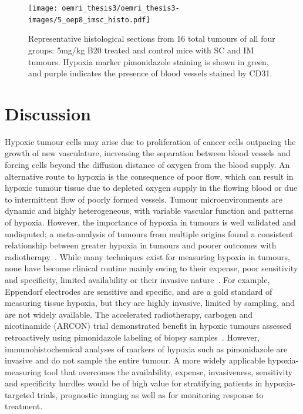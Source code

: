 \begin{figure}[htbp]
   \centering
   \texttt{[image: oemri\_thesis3/oemri\_thesis3-images/5\_oep8\_imsc\_histo.pdf]} %
   \caption{Representative histological sections from 16 total tumours of all four groups: 5mg/kg B20 treated and control mice with \acs{SC} and \acs{IM} tumours.
   Hypoxia marker pimonidazole staining is shown in green, and purple indicates the presence of blood vessels stained by CD31.}
   \label{allHisto}
\end{figure}

\section{Discussion}

Hypoxic tumour cells may arise due to proliferation of cancer cells outpacing the growth of new vasculature, increasing the separation between blood vessels and forcing cells beyond the diffusion distance of oxygen from the blood supply. 
An alternative route to hypoxia is the consequence of poor flow, which can result in hypoxic tumour tissue due to depleted oxygen supply in the flowing blood or due to intermittent flow of poorly formed vessels. 
Tumour microenvironments are dynamic and highly heterogeneous, with variable vascular function and patterns of hypoxia.
However, the importance of hypoxia in tumours is well validated and undisputed; a meta-analysis of tumours from multiple origins found a consistent relationship between greater hypoxia in tumours and poorer outcomes with radiotherapy~\cite{Horsman:2012kw}.
While many techniques exist for measuring hypoxia in tumours, none have become clinical routine mainly owing to their expense, poor sensitivity and specificity, limited availability or their invasive nature~\cite{Colliez:2017fc,Baumann:2016gr}. 
For example, Eppendorf electrodes are sensitive and specific, and are a gold standard of measuring tissue hypoxia, but they are highly invasive, limited by sampling, and are not widely available. 
The accelerated radiotherapy, carbogen and nicotinamide (ARCON) trial demonstrated benefit in hypoxic tumours assessed retroactively using pimonidazole labeling of biopsy samples~\cite{Kaanders:2002wl}. 
However, immunohistochemical analyses of markers of hypoxia such as pimonidazole are invasive and do not sample the entire tumour.
A more widely applicable hypoxia-measuring tool that overcomes the availability, expense, invasiveness, sensitivity and specificity hurdles would be of high value for stratifying patients in hypoxia-targeted trials, prognostic imaging as well as for monitoring response to treatment. 

